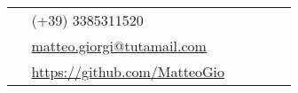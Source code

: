 \documentclass[10pt]{article} %
\begin{document}
\begin{paracol}{2}

\switchcolumn %


\parbox[top][0.12\textheight][c]{\linewidth}{ %
	\vspace{-0.04\textheight} %
	\colorbox{shade}{ %
		\begin{supertabular}{p{0.05\linewidth}|p{0.775\linewidth}} %
			\raisebox{-1pt}{\faPhone} & (+39) 3385311520 \\ %
			\raisebox{0pt}{\small\faEnvelope} & \href{mailto:matteo.giorgi@tutamail.com}{matteo.giorgi@tutamail.com} \\ %
			\raisebox{-1pt}{\faGithub} & \href{https://github.com/MatteoGio}{https://github.com/MatteoGio} \\ %
		\end{supertabular}
	}
}



\end{paracol}
\end{document}
